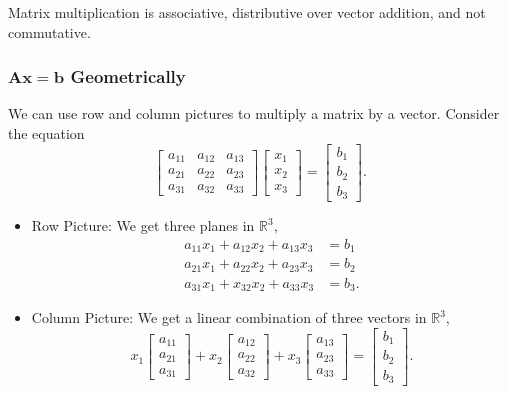 \documentclass[11pt]{scrartcl}
\theoremstyle{plain}
\theoremstyle{definition}
\theoremstyle{remark}
\begin{document}
Matrix multiplication is associative, distributive over vector addition, and not commutative. 

\subsubsection{$\mathbf{A}\mathbf{x}=\mathbf{b}$ Geometrically}

We can use row and column pictures to multiply a matrix by a vector. Consider the equation
\[ \begin{bmatrix}a_{11} & a_{12} & a_{13} \\ a_{21} & a_{22} & a_{23} \\ a_{31} & a_{32} & a_{33}\end{bmatrix}
\begin{bmatrix}x_{1} \\ x_{2} \\ x_{3}\end{bmatrix}=\begin{bmatrix}b_{1} \\ b_{2} \\ b_{3}\end{bmatrix}. \]

\begin{itemize}
    \item Row Picture: We get three planes in $\mathbb{R}^{3}$,
    \[ \begin{aligned} a_{11}x_{1}+a_{12}x_{2}+a_{13}x_{3}&=b_{1} \\ a_{21}x_{1}+a_{22}x_{2}+a_{23}x_{3}&=b_{2} \\ 
    a_{31}x_{1}+x_{32}x_{2}+a_{33}x_{3}&=b_{3}. \end{aligned} \]
    \item Column Picture: We get a linear combination of three vectors in $\mathbb{R}^{3}$,
    \[ x_{1}\begin{bmatrix}a_{11} \\ a_{21} \\ a_{31}\end{bmatrix} + x_{2}\begin{bmatrix}a_{12} \\ a_{22} \\ a_{32}
    \end{bmatrix} + x_{3}\begin{bmatrix}a_{13} \\ a_{23} \\ a_{33}\end{bmatrix} = \begin{bmatrix}b_{1} \\ b_{2} \\ 
    b_{3}\end{bmatrix}. \]
\end{itemize}
\end{document}

